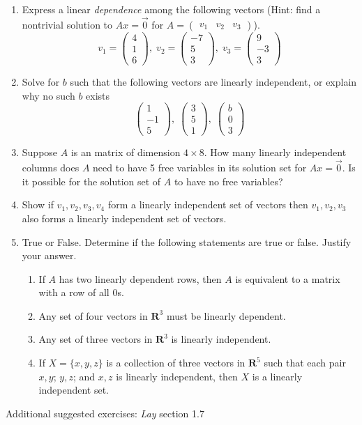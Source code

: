 \documentclass[12pt]{article}
\numberwithin{equation}{subsection}
\numberwithin{figure}{subsection}
\theoremstyle{note}
\begin{document}
\begin{enumerate}[label=\arabic*.]
	\item Express a linear \textit{dependence} among the following vectors (Hint: find a nontrivial solution to $Ax=\vec{0}$ for $A=\begin{pmatrix} v_1 & v_2 & v_3\end{pmatrix}$). \[ v_1=\begin{pmatrix} 4 \\ 1 \\ 6 \end{pmatrix}, \;
			v_2=\begin{pmatrix} -7 \\ 5 \\ 3 \end{pmatrix}, \;
			v_3=\begin{pmatrix} 9 \\ -3 \\ 3 \end{pmatrix}\]
	\item Solve for $b$ such that the following vectors are linearly independent, or explain why no such $b$ exists
	\[ 
			\begin{pmatrix} 1 \\ -1 \\ 5 \end{pmatrix}, \;
			\begin{pmatrix} 3 \\ 5 \\ 1 \end{pmatrix}, \;
			\begin{pmatrix} b \\ 0 \\ 3 \end{pmatrix}
		\]
		
	\item Suppose $A$ is an matrix of dimension $4\times 8$. How many linearly independent  columns does $A$ need to have 5 free variables in its solution set for $Ax=\vec{0}$. Is it possible for the solution set of $A$ to have no free variables? 
	
	\item Show if $v_1,v_2,v_3,v_4$ form a linearly independent set of vectors then $v_1,v_2,v_3$ also forms a linearly independent set of vectors. 
	
	\item True or False. Determine if the following statements are true or false. Justify your answer. 
	\begin{enumerate}
		\item If $A$ has two linearly dependent rows, then $A$ is equivalent to a matrix with a row of all $0$s. 
		\item Any set of four vectors in $\mathbf{R}^3$ must be linearly dependent. 
		\item Any set of three vectors in $\mathbf{R}^3$ is linearly independent.
		\item If $X=\{x,y,z\}$ is a collection of three vectors in $\mathbf{R}^5$ such that each pair $x,y$; $y,z$; and $x,z$ is linearly independent, then $X$ is a linearly independent set.
	\end{enumerate}
\end{enumerate} 
Additional suggested exercises: \textit{Lay} section 1.7
\end{document}

